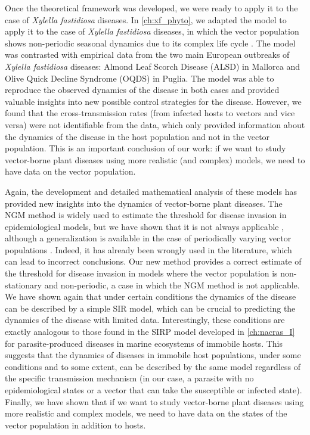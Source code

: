 Once the theoretical framework was developed, we were ready to apply it to the
case of \textit{Xylella fastidiosa} diseases. In \cref{ch:xf_phyto}, we adapted
the model to apply it to the case of \textit{Xylella fastidiosa} diseases, in
which the vector population shows non-periodic seasonal dynamics due to its
complex life cycle \cite{GimenezRomero2023}. The model was contrasted with
empirical data from the two main European outbreaks of \textit{Xylella
    fastidiosa} diseases: Almond Leaf Scorch Disease (ALSD) in Mallorca and
Olive Quick Decline Syndrome (OQDS) in Puglia. The model was able to reproduce
the observed dynamics of the disease in both cases and provided valuable
insights into new possible control strategies for the disease. However, we
found that the cross-transmission rates (from infected hosts to vectors and
vice versa) were not identifiable from the data, which only provided
information about the dynamics of the disease in the host population and not in
the vector population. This is an important conclusion of our work: if we want
to study vector-borne plant diseases using more realistic (and complex) models,
we need to have data on the vector population.

Again, the development and detailed mathematical analysis of these models has
provided new insights into the dynamics of vector-borne plant diseases. The NGM
method is widely used to estimate the threshold for disease invasion in
epidemiological models, but we have shown that it is not always applicable
\cite{GimenezRomero2022_PRE}, although a generalization is available in the
case of periodically varying vector populations \cite{Bacaer2006}.
Indeed, it has already been wrongly used in the literature, which can lead to
incorrect conclusions. Our new method provides a correct estimate of the
threshold for disease invasion in models where the vector population is
non-stationary and non-periodic, a case in which the NGM method is not
applicable. We have shown again that under certain conditions the dynamics of
the disease can be described by a simple SIR model, which can be crucial to
predicting the dynamics of the disease with limited data. Interestingly, these
conditions are exactly analogous to those found in the SIRP model developed in
\cref{ch:nacras_I} for parasite-produced diseases in marine ecosystems of
immobile hosts. This suggests that the dynamics of diseases in immobile host
populations, under some conditions and to some extent, can be described by the
same model regardless of the specific transmission mechanism (in our case, a
parasite with no epidemiological states or a vector that can take the
susceptible or infected state). Finally, we have shown that if we want to study
vector-borne plant diseases using more realistic and complex models, we need to
have data on the states of the vector population in addition to hosts.

